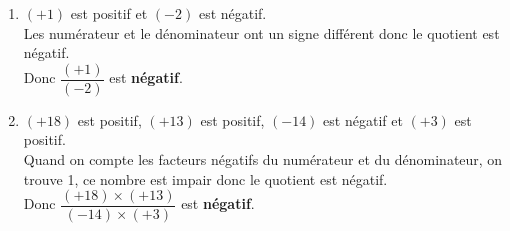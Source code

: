 \begin{corrige}
\begin{enumerate}
            \item $ (+1) $ est positif et $ (-2) $ est négatif.\\
           Les numérateur et le dénominateur ont un signe différent donc le quotient est négatif.\\
          Donc $ \dfrac{(+1)}{(-2)} $ est {\bfseries \color[HTML]{f15929}négatif}.
            \item $ (+18) $ est positif, $ (+13) $ est positif, $ (-14) $ est négatif et $ (+3) $ est positif.\\
           Quand on compte les facteurs négatifs du numérateur et du dénominateur, on trouve 1, ce nombre est impair donc le quotient est négatif.\\
          Donc $ \dfrac{(+18) \times (+13)}{(-14) \times (+3)} $ est {\bfseries \color[HTML]{f15929}négatif}.                
        \end{enumerate}
\end{corrige}

